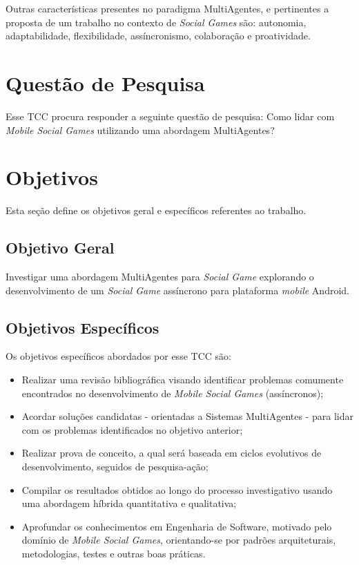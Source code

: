 Outras características presentes no paradigma
MultiAgentes, e pertinentes a proposta de um trabalho no contexto de
\textit{Social Games} são: autonomia, adaptabilidade, flexibilidade,
assíncronismo, colaboração e proatividade\cite{bergenti2015}.


\section{Questão de Pesquisa}

Esse TCC procura responder a seguinte questão de pesquisa: Como lidar com \textit{Mobile Social Games} utilizando uma abordagem MultiAgentes?


\section{Objetivos}

Esta seção define os objetivos geral e específicos referentes ao trabalho.

    \subsection{Objetivo Geral}

        Investigar uma abordagem MultiAgentes para \textit{Social Game} explorando o desenvolvimento de um \textit{Social Game} assíncrono para plataforma \textit{mobile} Android.

    \subsection{Objetivos Específicos}

        Os objetivos específicos abordados por esse TCC são:

        \begin{itemize}
          \item Realizar uma revisão bibliográfica visando identificar problemas comumente encontrados no desenvolvimento de \textit{Mobile Social Games} (assíncronos);
          \item Acordar soluções candidatas - orientadas a Sistemas MultiAgentes - para lidar com os problemas identificados no objetivo anterior;
          \item Realizar prova de conceito, a qual será baseada em ciclos evolutivos de desenvolvimento, seguidos de pesquisa-ação;
          \item Compilar os resultados obtidos ao longo do processo investigativo usando uma abordagem híbrida quantitativa e qualitativa;
          \item Aprofundar os conhecimentos em Engenharia de Software, motivado pelo domínio de \textit{Mobile Social Games}, orientando-se por padrões arquiteturais, metodologias, testes e outras boas práticas.
        \end{itemize}

